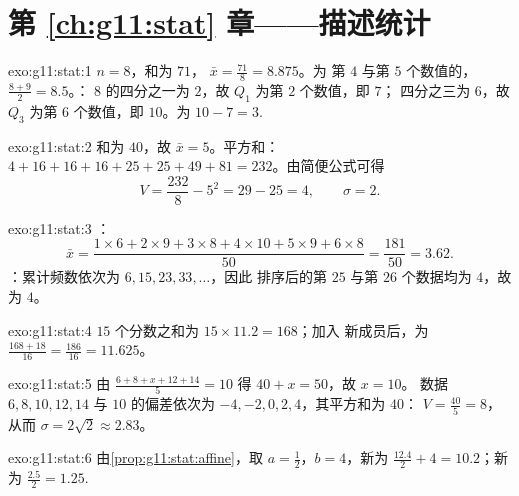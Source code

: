 \section*{第 \ref{ch:g11:stat} 章——描述统计}

\begin{solution}{exo:g11:stat:1}
$n = 8$，和为 $71$， $\bar x = \frac{71}{8} = 8.875$。为
第 $4$ 与第 $5$ 个数值的，$\frac{8 + 9}{2} = 8.5$。：
$8$ 的四分之一为 $2$，故 $Q_1$ 为第 $2$ 个数值，即 $7$；
四分之三为 $6$，故 $Q_3$ 为第 $6$ 个数值，即 $10$。为
$10 - 7 = 3$.
\end{solution}

\begin{solution}{exo:g11:stat:2}
和为 $40$，故 $\bar x = 5$。平方和：
$4 + 16 + 16 + 16 + 25 + 25 + 49 + 81 = 232$。由简便公式可得
\[
V = \frac{232}{8} - 5^2 = 29 - 25 = 4,
\qquad
\sigma = 2 .
\]
\end{solution}

\begin{solution}{exo:g11:stat:3}
：
\[
\bar x = \frac{1 \times 6 + 2 \times 9 + 3 \times 8 + 4 \times 10
+ 5 \times 9 + 6 \times 8}{50}
= \frac{181}{50} = 3.62 .
\]
：累计频数依次为 $6, 15, 23, 33, \dots$，因此
排序后的第 $25$ 与第 $26$ 个数据均为 $4$，故为 $4$。
\end{solution}

\begin{solution}{exo:g11:stat:4}
$15$ 个分数之和为 $15 \times 11.2 = 168$；加入
新成员后，为 $\frac{168 + 18}{16} = \frac{186}{16} = 11.625$。
\end{solution}

\begin{solution}{exo:g11:stat:5}
由 $\frac{6 + 8 + x + 12 + 14}{5} = 10$ 得 $40 + x = 50$，故 $x = 10$。
数据 $6, 8, 10, 12, 14$ 与 $10$ 的偏差依次为
$-4, -2, 0, 2, 4$，其平方和为 $40$：
$V = \frac{40}{5} = 8$，从而 $\sigma = 2\sqrt2 \approx 2.83$。
\end{solution}

\begin{solution}{exo:g11:stat:6}
由\cref{prop:g11:stat:affine}，取 $a = \frac12$，$b = 4$，新为
$\frac{12.4}{2} + 4 = 10.2$；新为
$\frac{2.5}{2} = 1.25$.
\end{solution}

